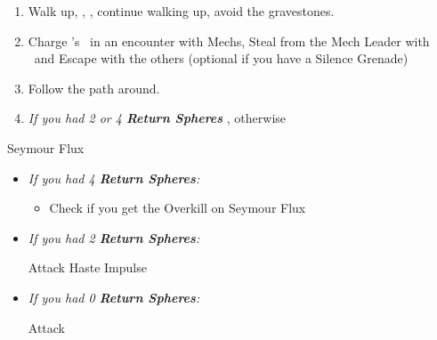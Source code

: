 \begin{enumerate}[resume]
    \item Walk up, \sd, \cs[1:20], continue walking up, avoid the gravestones.
    \item Charge \rikku's \od\ in an encounter with Mechs, Steal from the Mech Leader with \rikku\ and Escape with the others (optional if you have a Silence Grenade)
    \item Follow the path around.
    \item \textit{If you had 2 or 4 \textbf{Return Spheres}} \formation{\tidus}{\yuna}{\auron}, otherwise \formation{\tidus}{\kimahri}{\wakka}
\end{enumerate}
\begin{battle}[70000]{Seymour Flux}
    \begin{itemize}
        \item \textit{If you had 4 \textbf{Return Spheres}:}
        \begin{itemize}
            \yunaf Attack
            \tidusf Haste \yuna
            \switch{\auron}{\rikku}
            \rikkuf \od\ HP Sphere + Grenade or Silence Grenade
            \summon{\bahamut}
            \bahamutf \textit{If you used a Silence Grenade} Impulse, otherwise Attack
            \yunaf Attack
            \tidusf \textit{If you used a Silence Grenade} Attack once, otherwise Defend
            \rikkuf Defend
            \item Check if you get the Overkill on Seymour Flux
        \end{itemize}
        \item \textit{If you had 2 \textbf{Return Spheres}:}
        \begin{itemize}
            \yunaf Attack
            \tidusf Haste \yuna
            \summon{\bahamut}
            \bahamutf Impulse
        \end{itemize}
        \item \textit{If you had 0 \textbf{Return Spheres}:}
        \begin{itemize}
            \switch{\tidus}{\yuna}
            \summon{\bahamut}
            \bahamutf Attack
        \end{itemize}
    \end{itemize}
\end{battle}

